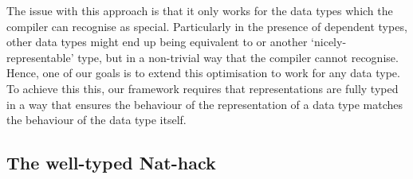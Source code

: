 The issue with this approach is that it only works for the data types which the
compiler can recognise as special. Particularly in the presence of dependent
types, other data types might end up being equivalent to  or
another `nicely-representable' type, but in a non-trivial way that the compiler
cannot recognise. Hence, one of our goals is to extend this optimisation to work
for any data type. To achieve this this, our framework requires that
representations are fully typed in a way that ensures the behaviour of the
representation of a data type matches the behaviour of the data type itself.

\subsection{The well-typed Nat-hack}

